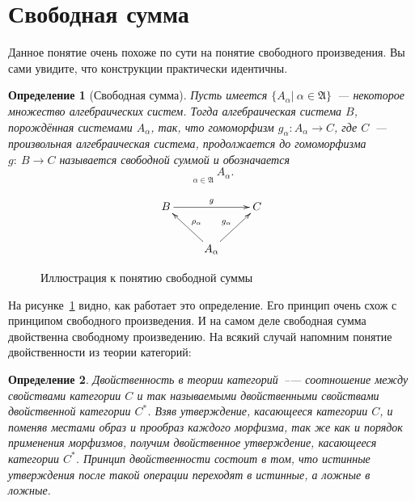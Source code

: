 \documentclass[a4paper, 12pt]{report}
\newtheorem{definition}{Определение}[chapter]
\begin{document}
\section{Свободная сумма}
Данное понятие очень похоже по сути на понятие свободного произведения. Вы сами увидите, что конструкции практически идентичны.

\begin{definition}[Свободная сумма]
Пусть имеется $\{A_{\alpha}|\ \alpha\in\mathfrak{A}\}$~--- некоторое множество алгебраических систем. Тогда алгебраическая система $B$, порождённая системами $A_{\alpha}$, так, что гомоморфизм $g_{\alpha}: A_{\alpha} \rightarrow C$, где $C$~--- произвольная алгебраическая система, продолжается до гомоморфизма $g:\ B\rightarrow C$ называется свободной суммой и обозначается
\[
\mathop{\textstyle{\sum^*}}\limits_{\alpha\in\mathfrak{A}} A_{\alpha}.
\]
\end{definition}


\begin{figure}[!h]
\begin{equation*}
\xymatrix{
B\ar[rr]^g & & C\\
 & A_{\alpha}\ar[lu]_{\rho_{\alpha}}\ar[ru]^{g_{\alpha}}
}
\end{equation*}
\caption{Иллюстрация к понятию свободной суммы}
\label{fig::free_sum}
\end{figure}

На рисунке~\ref{fig::free_sum} видно, как работает это определение. Его принцип очень схож с принципом свободного произведения. И на самом деле свободная сумма двойственна свободному произведению. На всякий случай напомним понятие двойственности из теории категорий:

\begin{definition}
Двойственность в теории категорий~--— соотношение между свойствами категории $C$ и так называемыми двойственными свойствами двойственной категории $C^*$. Взяв утверждение, касающееся категории $C$, и поменяв местами образ и прообраз каждого морфизма, так же как и порядок применения морфизмов, получим двойственное утверждение, касающееся категории $C^*$. Принцип двойственности состоит в том, что истинные утверждения после такой операции переходят в истинные, а ложные в ложные.
\end{definition}
\end{document}
